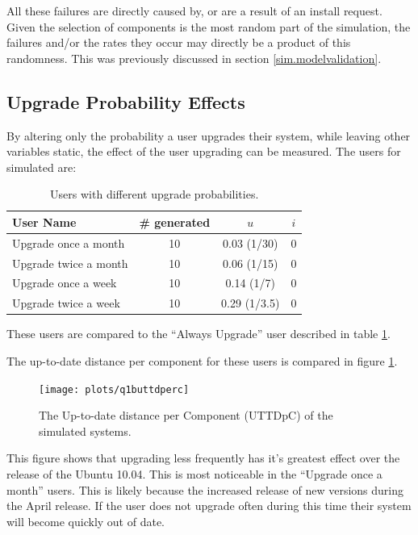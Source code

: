 All these failures are directly caused by, or are a result of an install request.
Given the selection of components is the most random part of the simulation, the failures and/or the rates they occur may directly be a product of this randomness.
This was previously discussed in section \ref{sim.modelvalidation}.


\subsection{Upgrade Probability Effects}
By altering only the probability a user upgrades their system, while leaving other variables static, the effect of the user upgrading can be measured.
The users for simulated are:
\begin{table}[h!]
\centering
\begin{tabular}{|l | c | c | c |}
\hline
User Name 				& \# generated 	& $u$ 		& $i$ 			\\ \hline
Upgrade once a month	& 10 			& 0.03 (1/30)			& 0				 \\
Upgrade twice a month	& 10 			& 0.06 (1/15)		& 0				\\
Upgrade once a week		& 10 			& 0.14 (1/7)		& 0				 \\
Upgrade twice a week 	& 10 			& 0.29 (1/3.5)		& 0				\\ \hline
\end{tabular}
\caption{Users with different upgrade probabilities.}
\label{exp.tblextremeusers}
\end{table}
These users are compared to the ``Always Upgrade'' user described in table \ref{exp.tblextremeusers}.

The up-to-date distance per component for these users is compared in figure \ref{exp.q1buttdperc}.
\begin{figure}[htp]
\begin{center}
  \texttt{[image: plots/q1buttdperc]}
  \caption{The Up-to-date distance per Component (UTTDpC) of the simulated systems.}
  \label{exp.q1buttdperc}
\end{center}
\end{figure}

This figure shows that upgrading less frequently has it's greatest effect over the release of the Ubuntu 10.04.
This is most noticeable in the ``Upgrade once a month'' users.
This is likely because the increased release of new versions during the April release.
If the user does not upgrade often during this time their system will become quickly out of date.

